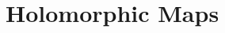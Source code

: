 \documentclass[../Moduli_Spaces_of_Riemann_Surfaces.tex]{subfiles}
\begin{document}
    \section{Holomorphic Maps}
    \begin{definition}\label{1.3:def:holomorphic_maps}
        
    \end{definition}
\end{document}
